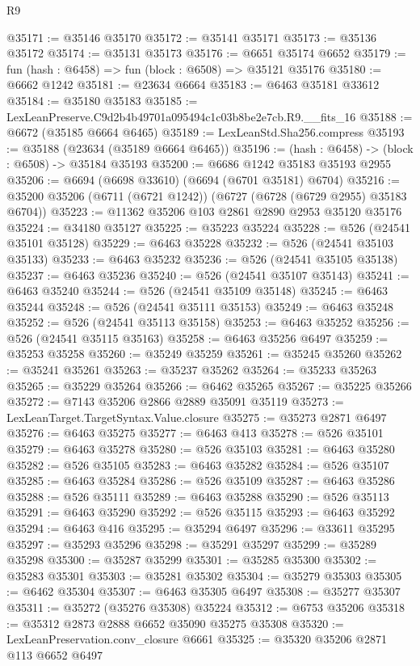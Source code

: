 \begin{lexlean}{R9}
\begin{coremodule}
@35171 := @35146 @35170
@35172 := @35141 @35171
@35173 := @35136 @35172
@35174 := @35131 @35173
@35176 := @6651 @35174 @6652
@35179 := fun (hash : @6458) => fun (block : @6508) => @35121 @35176
@35180 := @6662 @1242
@35181 := @23634 @6664
@35183 := @6463 @35181 @33612
@35184 := @35180 @35183
@35185 := LexLeanPreserve.C9d2b4b49701a095494c1c03b8be2e7cb.R9.__fits_16
@35188 := @6672 (@35185 @6664 @6465)
@35189 := LexLeanStd.Sha256.compress
@35193 := @35188 (@23634 (@35189 @6664 @6465))
@35196 := (hash : @6458) -> (block : @6508) -> @35184 @35193
@35200 := @6686 @1242 @35183 @35193 @2955
@35206 := @6694 (@6698 @33610) (@6694 (@6701 @35181) @6704)
@35216 := @35200 @35206 (@6711 (@6721 @1242)) (@6727 (@6728 (@6729 @2955) @35183 @6704))
@35223 := @11362 @35206 @103 @2861 @2890 @2953 @35120 @35176
@35224 := @34180 @35127
@35225 := @35223 @35224
@35228 := @526 (@24541 @35101 @35128)
@35229 := @6463 @35228
@35232 := @526 (@24541 @35103 @35133)
@35233 := @6463 @35232
@35236 := @526 (@24541 @35105 @35138)
@35237 := @6463 @35236
@35240 := @526 (@24541 @35107 @35143)
@35241 := @6463 @35240
@35244 := @526 (@24541 @35109 @35148)
@35245 := @6463 @35244
@35248 := @526 (@24541 @35111 @35153)
@35249 := @6463 @35248
@35252 := @526 (@24541 @35113 @35158)
@35253 := @6463 @35252
@35256 := @526 (@24541 @35115 @35163)
@35258 := @6463 @35256 @6497
@35259 := @35253 @35258
@35260 := @35249 @35259
@35261 := @35245 @35260
@35262 := @35241 @35261
@35263 := @35237 @35262
@35264 := @35233 @35263
@35265 := @35229 @35264
@35266 := @6462 @35265
@35267 := @35225 @35266
@35272 := @7143 @35206 @2866 @2889 @35091 @35119
@35273 := LexLeanTarget.TargetSyntax.Value.closure
@35275 := @35273 @2871 @6497
@35276 := @6463 @35275
@35277 := @6463 @413
@35278 := @526 @35101
@35279 := @6463 @35278
@35280 := @526 @35103
@35281 := @6463 @35280
@35282 := @526 @35105
@35283 := @6463 @35282
@35284 := @526 @35107
@35285 := @6463 @35284
@35286 := @526 @35109
@35287 := @6463 @35286
@35288 := @526 @35111
@35289 := @6463 @35288
@35290 := @526 @35113
@35291 := @6463 @35290
@35292 := @526 @35115
@35293 := @6463 @35292
@35294 := @6463 @416
@35295 := @35294 @6497
@35296 := @33611 @35295
@35297 := @35293 @35296
@35298 := @35291 @35297
@35299 := @35289 @35298
@35300 := @35287 @35299
@35301 := @35285 @35300
@35302 := @35283 @35301
@35303 := @35281 @35302
@35304 := @35279 @35303
@35305 := @6462 @35304
@35307 := @6463 @35305 @6497
@35308 := @35277 @35307
@35311 := @35272 (@35276 @35308) @35224
@35312 := @6753 @35206
@35318 := @35312 @2873 @2888 @6652 @35090 @35275 @35308
@35320 := LexLeanPreservation.conv_closure @6661
@35325 := @35320 @35206 @2871 @113 @6652 @6497

\end{coremodule}
\end{lexlean}
